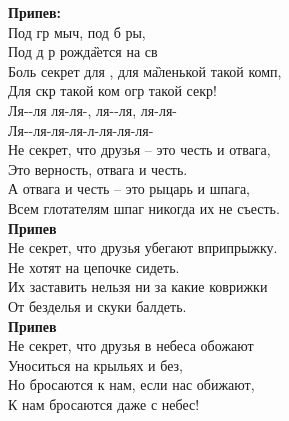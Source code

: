 \documentclass[fleqn,a5paper,12pt,twoside]{guitartabs}
\newcommand{\musVspace}{\vspace{2mm}}
\begin{document}
    \-\hspace{4mm}\textbf{Припев:}\\
    \-\hspace{4mm}Под гр мыч, под б ры,\\
    \-\hspace{4mm}Под д р рожд\G{ается} на св\\
    \-\hspace{4mm}Боль секрет для , для м\G{аленькой} такой комп,\\
    \-\hspace{4mm}Для скр такой ком огр такой секр!\musVspace\\

    \-\hspace{4mm}Ля--ля ля-ля-, ля--ля, ля-ля-\\
    \-\hspace{4mm}Ля--ля-ля-ля-л-ля-ля-ля-\\
    \newpage
    Не секрет, что друзья -- это честь и отвага,    \\  
    Это верность, отвага и честь.     \\
    А отвага и честь -- это рыцарь и шпага,    \\            
    Всем глотателям шпаг никогда их не съесть.\\   

    \-\hspace{4mm}\textbf{Припев}\\
    
    Не секрет, что друзья убегают вприпрыжку.  \\     
    Не хотят на цепочке сидеть.    \\
    Их заставить нельзя ни за какие коврижки     \\       
    От безделья и скуки балдеть. \\
    
    \-\hspace{4mm}\textbf{Припев}\\
    
    Не секрет, что друзья в небеса обожают   \\ 
    Уноситься на крыльях и без,        \\
    Но бросаются к нам, если нас обижают,  \\      
    К нам бросаются даже с небес! \\
    
\end{document}
